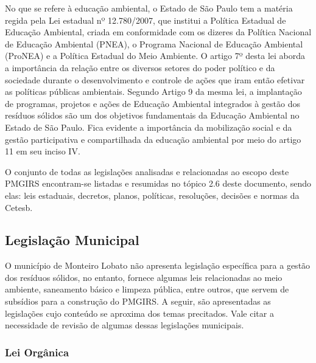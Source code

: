 	
	No que se refere à educação ambiental, o Estado de São Paulo tem a matéria regida pela Lei estadual nº 12.780/2007, que institui a Política Estadual de Educação Ambiental, criada em conformidade com os dizeres da Política Nacional de Educação Ambiental (PNEA), o Programa Nacional de Educação Ambiental (ProNEA) e a Política Estadual do Meio Ambiente. O artigo 7º desta lei aborda a importância da relação entre os diversos setores do poder político e da sociedade durante o desenvolvimento e controle de ações que iram então efetivar as políticas públicas ambientais. Segundo Artigo 9 da mesma lei, a implantação de programas, projetos e ações de Educação Ambiental integrados à gestão dos resíduos sólidos são um dos objetivos fundamentais da Educação Ambiental no Estado de São Paulo. Fica evidente a importância da mobilização social e da gestão participativa e compartilhada da educação ambiental por meio do artigo 11 em seu inciso IV.
	
	O conjunto de todas as legislações analisadas e relacionadas ao escopo deste PMGIRS encontram-se listadas e resumidas no tópico 2.6 deste documento, sendo elas: leis estaduais, decretos, planos, políticas, resoluções, decisões e normas da Cetesb.
	
	\subsection{Legislação Municipal}
	O município de Monteiro Lobato não apresenta legislação específica para a gestão dos resíduos sólidos, no entanto, fornece algumas leis relacionadas ao meio ambiente, saneamento básico e limpeza pública, entre outros, que servem de subsídios para a construção do PMGIRS. A seguir, são apresentadas as legislações cujo conteúdo se aproxima dos temas precitados. Vale citar a necessidade de revisão de algumas dessas legislações municipais.
	
	\subsubsection{Lei Orgânica}
	
